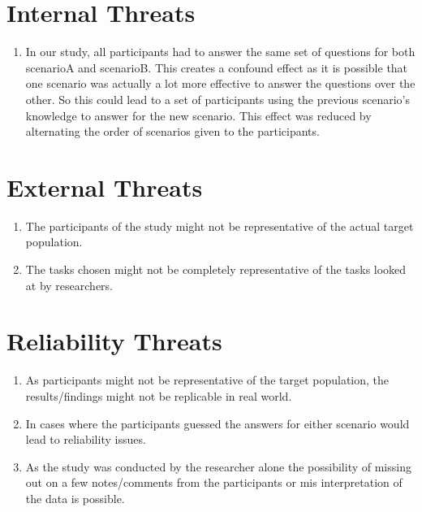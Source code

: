 \documentclass[seploa]{beavtex}
\begin{document}
\section{Internal Threats}
\begin{enumerate}
\item In our study, all participants had to answer the same set of questions for both scenarioA and scenarioB. This creates a confound effect as it is possible that one scenario was actually a lot more effective to answer the questions over the other. So this could lead to a set of participants using the previous scenario's knowledge to answer for the new scenario. This effect was reduced by alternating the order of scenarios given to the participants.
\end{enumerate}

\section{External Threats}
\begin{enumerate}
\item The participants of the study might not be representative of the actual target population.
\item The tasks chosen might not be completely representative of the tasks looked at by researchers.
\end{enumerate}

\section{Reliability Threats}
\begin{enumerate}
\item As participants might not be representative of the target population, the results/findings might not be replicable in real world.
\item In cases where the participants guessed the answers for either scenario would lead to reliability issues.
\item As the study was conducted by the researcher alone the possibility of missing out on a few notes/comments from the participants or mis interpretation of the data is possible.
\end{enumerate}
\end{document}
